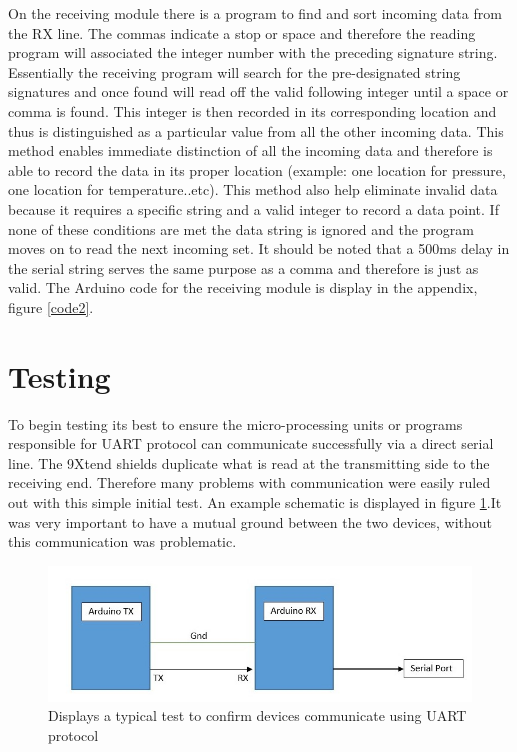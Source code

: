 \documentclass[paper=a4, fontsize=11pt]{scrartcl}
\numberwithin{equation}{section}		%
\numberwithin{figure}{section}			%
\numberwithin{table}{section}				%
\begin{document}
On the receiving module there is a program to find and sort incoming data from the RX line. The commas indicate a stop or space and therefore the reading program will associated the integer number with the preceding signature string. Essentially the receiving program will search for the pre-designated string signatures and once found will read off the valid following integer until a space or comma is found. This integer is then recorded in its corresponding location and thus is distinguished as a particular value from all the other incoming data. This method enables immediate distinction of all the incoming data and therefore is able to record the data in its proper location (example: one location for pressure, one location for temperature..etc). This method also help eliminate invalid data because it requires a specific string and a valid integer to record a data point. If none of these conditions are met the data string is ignored and the program moves on to read the next incoming set. It should be noted that a 500ms delay in the serial string serves the same purpose as a comma and therefore is just as valid. The Arduino code for the receiving module is display in the appendix, figure \ref{code2}.

\section{Testing}
To begin testing its best to ensure the micro-processing units or programs responsible for UART protocol can communicate successfully via a direct serial line. The 9Xtend shields duplicate what is read at the transmitting side to the receiving end. Therefore many problems with communication were easily ruled out with this simple initial test. An example schematic is displayed in figure \ref{test1}.It was very important to have a mutual ground between the two devices, without this communication was problematic.

\begin{figure}[H]
\centering
\includegraphics[width=0.9\linewidth]{test1}
\caption{ Displays a typical test to confirm devices communicate using UART protocol}
\label{test1}
\end{figure}
\end{document}

